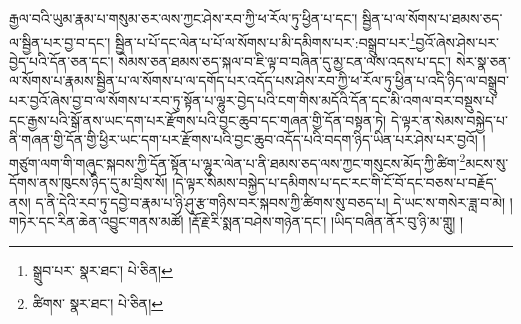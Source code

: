 རྒྱལ་བའི་ཡུམ་རྣམ་པ་གསུམ་ཅར་ལས་ཀྱང་ཤེས་རབ་ཀྱི་ཕ་རོལ་ཏུ་ཕྱིན་པ་དང་། སྦྱིན་པ་ལ་སོགས་པ་ཐམས་ཅད་ལ་སྦྱིན་པར་བྱ་བ་དང་། སྦྱིན་པ་པོ་དང་ལེན་པ་པོ་ལ་སོགས་པ་མི་དམིགས་པར་:བསྒྲུབ་པར་\footnote{སྒྲུབ་པར་  སྣར་ཐང་།  པེ་ཅིན། }བྱའོ་ཞེས་ཤེས་པར་བྱེད་པའི་དོན་ཅན་དང་། སེམས་ཅན་ཐམས་ཅད་སྐལ་བ་ཇི་ལྟ་བ་བཞིན་དུ་མྱ་ངན་ལས་འདས་པ་དང་། སེར་སྣ་ཅན་ལ་སོགས་པ་རྣམས་སྦྱིན་པ་ལ་སོགས་པ་ལ་དགོད་པར་འདོད་པས་ཤེས་རབ་ཀྱི་ཕ་རོལ་ཏུ་ཕྱིན་པ་འདི་ཉིད་ལ་བསྒྲུབ་པར་བྱའོ་ཞེས་བྱ་བ་ལ་སོགས་པ་རབ་ཏུ་སྟོན་པ་ལྷུར་བྱེད་པའི་ངག་གིས་མདོའི་དོན་དང་མི་འགལ་བར་བསྡུས་པ་དང་རྒྱས་པའི་སྒོ་ནས་ཡང་དག་པར་རྫོགས་པའི་བྱང་ཆུབ་དང་གཞན་གྱི་དོན་བསྟན་ཏེ། དེ་ལྟར་ན་སེམས་བསྐྱེད་པ་ནི་གཞན་གྱི་དོན་གྱི་ཕྱིར་ཡང་དག་པར་རྫོགས་པའི་བྱང་ཆུབ་འདོད་པའི་བདག་ཉིད་ཡིན་པར་ཤེས་པར་བྱའོ། །གཙུག་ལག་གི་གཞུང་སྐབས་ཀྱི་དོན་སྟོན་པ་ལྷུར་ལེན་པ་ནི་ཐམས་ཅད་ལས་ཀྱང་གསུངས་མོད་ཀྱི་ཚིག་\footnote{ཚིགས་  སྣར་ཐང་།  པེ་ཅིན། }མངས་སུ་དོགས་ནས་ཁུངས་ཉིད་དུ་མ་བྲིས་སོ། །དེ་ལྟར་སེམས་བསྐྱེད་པ་དམིགས་པ་དང་རང་གི་ངོ་བོ་དང་བཅས་པ་བརྗོད་ནས། ད་ནི་དེའི་རབ་ཏུ་དབྱེ་བ་རྣམ་པ་ཉི་ཤུ་རྩ་གཉིས་བར་སྐབས་ཀྱི་ཚིགས་སུ་བཅད་པ། དེ་ཡང་ས་གསེར་ཟླ་བ་མེ། །གཏེར་དང་རིན་ཆེན་འབྱུང་གནས་མཚོ། །རྡོ་རྗེ་རི་སྨན་བཤེས་གཉེན་དང་། །ཡིད་བཞིན་ནོར་བུ་ཉི་མ་གླུ། །
